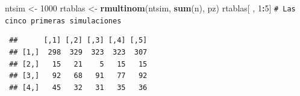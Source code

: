 \documentclass[
  spanish,
  10pt,
]{book}
\newenvironment{Shaded}{\begin{snugshade}}{\end{snugshade}}
\newcommand{\CommentTok}[1]{\textcolor[rgb]{0.56,0.35,0.01}{\textit{#1}}}
\newcommand{\DecValTok}[1]{\textcolor[rgb]{0.00,0.00,0.81}{#1}}
\newcommand{\FunctionTok}[1]{\textcolor[rgb]{0.13,0.29,0.53}{\textbf{#1}}}
\newcommand{\NormalTok}[1]{#1}
\newcommand{\OtherTok}[1]{\textcolor[rgb]{0.56,0.35,0.01}{#1}}
\newcommand{\SpecialCharTok}[1]{\textcolor[rgb]{0.81,0.36,0.00}{\textbf{#1}}}
\theoremstyle{break}
\theoremstyle{nonumberplain}
\renewcommand{\CommentTok}[1]{\textcolor[rgb]{0.41,0.41,0.41}{\texttt{#1}}}
\begin{document}
\begin{Shaded}
\begin{Highlighting}[]
\NormalTok{ntsim }\OtherTok{\textless{}{-}} \DecValTok{1000}
\NormalTok{rtablas }\OtherTok{\textless{}{-}} \FunctionTok{rmultinom}\NormalTok{(ntsim, }\FunctionTok{sum}\NormalTok{(n), pz)}
\NormalTok{rtablas[ , }\DecValTok{1}\SpecialCharTok{:}\DecValTok{5}\NormalTok{] }\CommentTok{\# Las cinco primeras simulaciones}
\end{Highlighting}
\end{Shaded}

\begin{verbatim}
 ##      [,1] [,2] [,3] [,4] [,5]
 ## [1,]  298  329  323  323  307
 ## [2,]   15   21    5   15   15
 ## [3,]   92   68   91   77   92
 ## [4,]   45   32   31   35   36
\end{verbatim}
\end{document}

